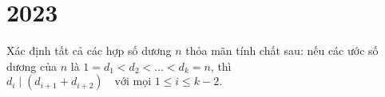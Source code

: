\documentclass[./m.tex]{subfiles}
\begin{document}
\section{2023}

\begin{problem}\label{problem:IMO-2023-P1}
    Xác định tất cả các hợp số dương \( n \) thỏa mãn tính chất sau: nếu các ước số dương của \( n \) là \( 1 = d_1 < d_2 < \dots < d_k = n \),
    thì \( d_i \mid (d_{i+1} + d_{i+2}) \quad \text{với mọi } 1 \leq i \leq k - 2. \)
\end{problem}
\end{document}
